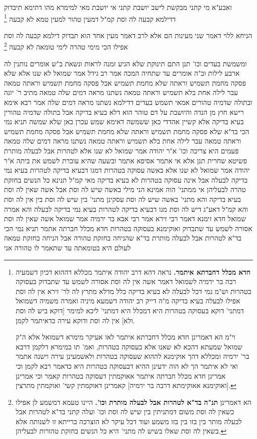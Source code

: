 \documentclass[12pt, openany]{book}
\newcommand{\footnotecomment}[1]{\footnote{#1}}
\newcommand{\commenta}[1]{\footnotecomment{#1}}
\begin{document}
{ואבע"א  מי קתני מבקשת לישב  יושבת קתני  אי יושבת מאי למימרא  מהו דתימא  תיבדוק דדילמא קבעה לה וסת קמ"ל דמעין טהור למעין טמא לא קבעה 
\commenta{\textbf{חדא מכלל דחברתא איתמר.}  נראה דהא דרב יהודה איתמר מכללא דההוא דכיון דשמעיה רבה בר ירמיה לשמואל דאמר אשה אין לה וסת אסורה לשמש עד שתבדוק בעסוקה בטהרות וש"מ נמי דכל לבעלה לא בעיא בדיקה כלל מדלא מתרץ לה לר' זירא אין לה וסת אפילו לבעלה בעיא בדיקה מ"ה דייק רב יהודה דשמעא מיניה ואמרה משמיה דשמואל דמתני' דוקא בעסוקה בטהרות היא דמכלל היא דמתני' ליכא למימר [דוקא ביש לה וסת ולא] אין לה וסת ודוקא עירה כדאיתמר לקמן.\par  וי"מ הא דאמרינן חדא מכלל דחברתא איתמר לאו אעיקר מימרא דשמואל אלא ה"ק שמואל שמעתא דהכא לא שאנו אלא בעסוקה בטהרות, ואמ' תו במימרא דלקמן דרבא בר' ירמיה ומכללא דהך אוקימנא לההוא שעסוקה בטהרות ולאשמעינן עירה וישנה אתמר ואי לא איתמר הך לא הוה ידעינן ההיא דבעסוקה בטהרות היא כדאמר רבא לקמן וכי אמרינן חדא מכלל חברתה איתמר אאוקמתין דעסוקה בטהרות קאמר וכי אמרינן [ואוקימנא אאוקימתא דרבה בר ירמיה] קאמרינן דאוקמתין קשי' ואוקמתין מתרצין. }

הניחא ללוי דאמר שני מעינות הם אלא לרב דאמר מעין אחד הוא תבדוק דילמא קבעה לה וסת  אפילו הכי מימי טהרה לימי טומאה לא קבעה
\commenta{הא דאמרינן \textbf{תנ"ה בד"א לטהרות אבל לבעלה מותרת וכו'.}  היינו טעמא דמשמע לן אפילו כשאין לה וסת משום דמתניתין בין שיש לה וסת וכו' ועלה קתני בד"א לטהרות אבל לבעלה מותר בין בזו בין בזו משמע ועוד דכל עיקר לא הוצרכה ברייתא זו לשנותה אלא בשאין לה וסת שאלו בשיש לה מתני' היא כל הנשים בחזקת טהורות לבעליהן. }

ומשמשת בעדים וכו' תנן התם  תינוקת שלא הגיע זמנה לראות ונשאת ב"ש אומרים  נותנין לה ארבע לילות  וב"ה אומרים  עד שתחיה המכה 
אמר רב גידל אמר שמואל  לא שנו אלא שלא פסקה מחמת תשמיש וראתה שלא מחמת תשמיש  אבל פסקה מחמת תשמיש וראתה טמאה 
עבר לילה אחת בלא תשמיש וראתה טמאה  נשתנו מראה דמים שלה טמאה  מתיב ר' יונה  ובתולה שדמיה טהורים אמאי  תשמש בעדים דדילמא נשתנו מראה דמים שלה 
אמר רבא אימא רישא  חוץ מן הנדה והיושבת על דם טוהר הוא דלא בעיא בדיקה אבל בתולה שדמיה טהורין בעיא בדיקה  אלא קשיין אהדדי 
כאן ששמשה דאימא שמש עכרן כאן שלא שמשה 
תניא נמי הכי  בד"א שלא פסקה מחמת תשמיש וראתה שלא מחמת תשמיש
אבל פסקה מחמת תשמיש וראתה טמאה עבר לילה אחת בלא תשמיש וראתה טמאה נשתנו מראה דמים שלה טמאה 
פעמים היא צריכה וכו' א"ר יהודה אמר שמואל  לא שנו אלא לטהרות אבל לבעלה מותרת  פשיטא שחרית תנן 
אלא אי אתמר אסיפא אתמר  ובשעה שהיא עוברת לשמש את ביתה  א"ר יהודה אמר שמואל  לא שנו אלא באשה עסוקה בטהרות דמגו דבעיא בדיקה לטהרות בעיא נמי בדיקה לבעלה  אבל אינה עסוקה בטהרות לא בעיא בדיקה 
מאי קמ"ל  תנינא  כל הנשים בחזקת טהרה לבעליהן  אי ממתני' הוה אמינא  הני מילי באשה שיש לה וסת אבל אשה שאין לה וסת בעיא בדיקה 
והא מתני' באשה שיש לה וסת עסקינן  מתני' בין שיש לה וסת בין אין לה וסת והא קמ"ל  דאע"ג דיש לה וסת מגו דבעיא בדיקה לטהרות בעיא נמי בדיקה לבעלה 
והא אמרה שמואל חדא זימנא  דאמר רבי זירא אמר רבי אבא בר ירמיה אמר שמואל  אשה שאין לה וסת אסורה לשמש עד שתבדוק  ואוקימנא  בעסוקה בטהרות  חדא מכלל חברתה אתמר 
תניא נמי הכי  בד"א לטהרות אבל לבעלה מותרת  בד"א שהניחה בחזקת טהורה אבל הניחה בחזקת טמאה לעולם היא בטומאתה עד שתאמר לו טהורה אני}
\end{document}
